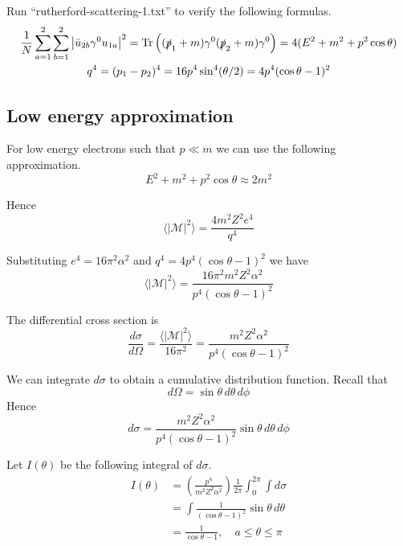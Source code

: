 \documentclass[12pt]{article}
\begin{document}
\noindent
Run ``rutherford-scattering-1.txt'' to verify the following formulas.
\begin{gather*}
\frac{1}{N}\sum_{a=1}^2\sum_{b=1}^2\left|\bar{u}_{2b}\gamma^0 u_{1a}\right|^2
=\mathop{\rm Tr}\left((\slashed{p}_1+m)\gamma^0(\slashed{p}_2+m)\gamma^0\right)
=4(E^2+m^2+p^2\cos\theta)
\\
q^4=(p_1-p_2)^4=16p^4\sin^4(\theta/2)=4p^4(\cos\theta-1)^2
\end{gather*}

\subsection*{Low energy approximation}
For low energy electrons such that $p\ll m$ we can use the following approximation.
\begin{equation*}
E^2+m^2+p^2\cos\theta\approx2m^2
\end{equation*}

\noindent
Hence
\begin{equation*}
\langle|\mathcal{M}|^2\rangle=\frac{4m^2Z^2e^4}{q^4}
\end{equation*}

\noindent
Substituting $e^4=16\pi^2\alpha^2$ and $q^4=4p^4(\cos\theta-1)^2$ we have
\begin{equation*}
\langle|\mathcal{M}|^2\rangle=\frac{16\pi^2m^2Z^2\alpha^2}{p^4(\cos\theta-1)^2}
\end{equation*}

\noindent
The differential cross section is
\begin{equation*}
\frac{d\sigma}{d\Omega}=\frac{\langle|\mathcal{M}|^2\rangle}{16\pi^2}
=\frac{m^2Z^2\alpha^2}{p^4(\cos\theta-1)^2}
\end{equation*}

\noindent
We can integrate $d\sigma$ to obtain a cumulative distribution function.
Recall that
\begin{equation*}
d\Omega=\sin\theta\,d\theta\,d\phi
\end{equation*}
Hence
\begin{equation*}
d\sigma=\frac{m^2Z^2\alpha^2}{p^4(\cos\theta-1)^2}\sin\theta\,d\theta\,d\phi
\end{equation*}

\noindent
Let $I(\theta)$ be the following integral of $d\sigma$.
\begin{align*}
I(\theta)
&=\left(\frac{p^4}{m^2Z^2\alpha^2}\right)\frac{1}{2\pi}\int_0^{2\pi}\int d\sigma
\\
&=\int\frac{1}{(\cos\theta-1)^2}\sin\theta\,d\theta
\\
&=\frac{1}{\cos\theta-1},\quad a\le\theta\le\pi
\end{align*}
\end{document}
